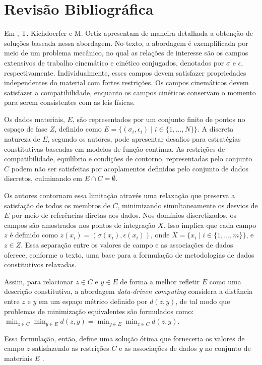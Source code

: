 \section{Revisão Bibliográfica}

Em \cite{Kirchdoerfer2017a}, T. Kichdoerfer e M. Ortiz apresentam de maneira detalhada a obtenção de soluções baseada nessa abordagem. No texto, a abordagem é exemplificada por meio de um problema mecânico, no qual as relações de interesse são os campos extensivos de trabalho cinemático e cinético conjugados, denotados por $\sigma$ e $\epsilon$, respectivamente. Individualmente, esses campos devem satisfazer propriedades independentes do material com fortes restrições. Os campos cinemáticos devem satisfazer a compatibilidade, enquanto os campos cinéticos conservam o momento para serem consistentes com as leis físicas. 

Os dados materiais, $E$, são representados por um conjunto finito de pontos no espaço de fase $Z$, definido como $E = \{(\sigma_i, \epsilon_i) \mid i \in \{1, \ldots, N\} \}$. A discreta natureza de $E$, segundo os autores, pode apresentar desafios para estratégias constitutivas baseadas em modelos de função contínua. As restrições de compatibilidade, equilíbrio e condições de contorno, representadas pelo conjunto $C$ podem não ser satisfeitas por acoplamentos definidos pelo conjunto de dados discretos, culminando em $E \cap C = \emptyset$.

Os autores contornam essa limitação através uma relaxação que preserva a satisfação de todos os membros de $C$, minimizando simultaneamente os desvios de $E$ por meio de referências diretas aos dados. Nos domínios discretizados, os campos são amostrados nos pontos de integração $X$. Isso implica que cada campo $z$ é definido como $z(x_i) = (\sigma(x_i), \epsilon(x_i))$, onde $X = \{x_i \mid i \in \{ 1, \ldots, m\} \}$, e $z \in Z$. Essa separação entre os valores de campo e as associações de dados oferece, conforme o texto, uma base para a formulação de metodologias de dados constitutivos relaxadas.

Assim, para relacionar $z \in C$ e $y \in E$ de forma a melhor refletir $E$ como uma descrição constitutiva, a abordagem \textit{data-driven computing} considera a distância entre $z$ e $y$ em um espaço métrico definido por $d(z,y)$, de tal modo que problemas de minimização equivalentes são formulados como: $\min_{z \in C} \min_{y \in E} d(z, y) = \min_{y \in E} \min_{z \in C} d(z, y)$.

Essa formulação, então, define uma solução ótima que forneceria os valores de campo $z$ satisfazendo as restrições $C$ e as associações de dados $y$ no conjunto de materiais $E$ \cite{Kirchdoerfer2017a}.

